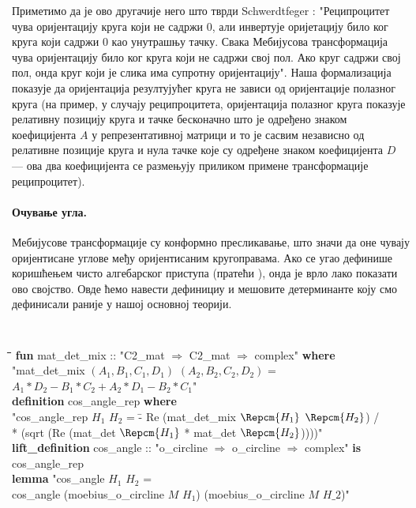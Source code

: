 \noindent Приметимо да је ово другачије него што тврди Schwerdtfeger
\cite{schwerdtfeger}: "Реципроцитет чува оријентацију круга који не
садржи 0, али инвертује оријетацију било ког круга који садржи 0 као
унутрашњу тачку. Свака Мебијусова трансформација чува оријентацију
било ког круга који не садржи свој пол. Ако круг садржи свој пол, онда
круг који је слика има супротну оријентацију". Наша формализација
показује да оријентација резултујућег круга не зависи од оријентације
полазног круга (на пример, у случају реципроцитета, оријентација
полазног круга показује релативну позицију круга и тачке бесконачно
што је одређено знаком коефицијента $A$ у репрезентативној матрици и
то је сасвим независно од релативне позиције круга и нула тачке које
су одређене знаком коефицијента $D$ --- ова два коефицијента се
размењују приликом примене трансформације реципроцитет).


\paragraph{Очување угла.}
Мебијусове трансформације су конформно пресликавање, што значи да оне
чувају оријентисане углове међу оријентисаним кругоправама. Ако се
угао дефинише коришћењем чисто алгебарског приступа (пратећи
\cite{schwerdtfeger}), онда је врло лако показати ово својство. Овде
ћемо навести дефинициу и мешовите детерминанте коју смо дефинисали
раније у нашој основној теорији.
 {\tt
  \begin{tabbing}
    \hspace{3mm}\=\hspace{5mm}\=\hspace{5mm}\=\hspace{5mm}\=\hspace{5mm}\=\kill
{\bf fun} mat\_det\_mix :: "C2\_mat $\Rightarrow$ C2\_mat $\Rightarrow$ complex" {\bf where}\\
\> "mat\_det\_mix $(A_1, B_1, C_1, D_1)$ $(A_2, B_2, C_2, D_2)$ =\\
\>\> $A_1*D_2 - B_1*C_2 + A_2*D_1 - B_2*C_1$"\\
{\bf definition} cos\_angle\_rep {\bf where}\\
\>  "cos\_angle\_rep $H_1$ $H_2$ = \=- Re (mat\_det\_mix $\Repcm{H_1}$ $\Repcm{H_2}$) / \\
\>  * (sqrt (Re (mat\_det $\Repcm{H_1}$ * mat\_det $\Repcm{H_2}$))))"\\
{\bf lift\_definition} cos\_angle :: "o\_circline $\Rightarrow$ o\_circline $\Rightarrow$ complex" {\bf is}\\
\> cos\_angle\_rep\\
{\bf lemma} "cos\_angle $H_1$ $H_2$ = \\
\> cos\_angle (moebius\_o\_circline $M$ $H_1$) (moebius\_o\_circline $M$ $H\_2$)"
  \end{tabbing}
}

